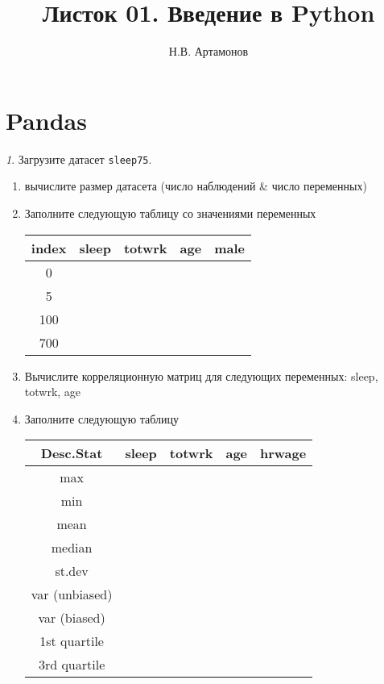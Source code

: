 \documentclass[12pt]{article}
\title{Листок 01. Введение в Python}
\author{Н.В. Артамонов}
\theoremstyle{remark}
\newtheorem{exercise}{}[section]
\begin{document}
\maketitle

\tableofcontents

\section{Pandas}

\begin{exercise}
Загрузите датасет \texttt{sleep75}.
\begin{enumerate}
	\item вычислите размер датасета (число наблюдений \& число переменных)
	\item Заполните следующую таблицу со значениями переменных
	\begin{center}
		\begin{tabular}{|c|c|c|c|c|} \hline
			index & sleep & totwrk & age & male\\ \hline\hline
			0 & & & & \\ \hline
			5 & & & & \\ \hline
			100 & & & & \\ \hline
			700 & & & & \\ \hline
		\end{tabular}
	\end{center}
	\item Вычислите корреляционную матриц для следующих переменных: sleep, totwrk, age 
	\item Заполните следующую таблицу
	\begin{center}
		\begin{tabular}{|c|c|c|c|c|} \hline
			Desc.Stat & sleep & totwrk & age & hrwage\\ \hline\hline
			max & & & & \\ \hline
			min & & & & \\ \hline
			mean & & & & \\ \hline
			median & & & & \\ \hline
			st.dev & & & & \\ \hline
			var (unbiased) & & & & \\ \hline
			var (biased) & & & & \\ \hline
			1st quartile & & & & \\ \hline
			3rd quartile & & & & \\ \hline
		\end{tabular}
	\end{center}

\end{enumerate}
\end{exercise}
\end{document}
